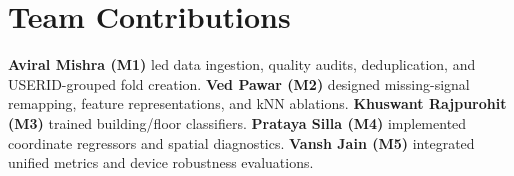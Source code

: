 \documentclass[conference]{IEEEtran}
\begin{document}
\section*{Team Contributions}
\textbf{Aviral Mishra (M1)} led data ingestion, quality audits, deduplication,
and USERID-grouped fold creation. \textbf{Ved Pawar (M2)} designed
missing-signal remapping, feature representations, and kNN ablations.
\textbf{Khuswant Rajpurohit (M3)} trained building/floor classifiers.
\textbf{Prataya Silla (M4)} implemented coordinate regressors and spatial
diagnostics. \textbf{Vansh Jain (M5)} integrated unified metrics and device
robustness evaluations.
\end{document}
